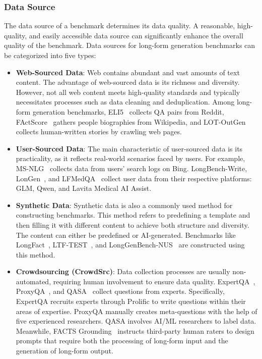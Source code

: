 \documentclass[11pt, a4paper, logo, copyright, nonumbering]{map}
\begin{document}
\subsubsection{Data Source}
\label{sec:long-form-data-source}

The data source of a benchmark determines its data quality. A reasonable, high-quality, and easily accessible data source can significantly enhance the overall quality of the benchmark. Data sources for long-form generation benchmarks can be categorized into five types:
\begin{itemize}
    \item \textbf{Web-Sourced Data}: Web contains abundant and vast amounts of text content. The advantage of web-sourced data is its richness and diversity. However, not all web content meets high-quality standards and typically necessitates processes such as data cleaning and deduplication. Among long-form generation benchmarks, ELI5~\citep{fan2019eli5} collects QA pairs from Reddit, FActScore~\citep{min2023factscore} gathers people biographies from Wikipedia, and LOT-OutGen~\citep{guan2022lot} collects human-written stories by crawling web pages.
    \item \textbf{User-Sourced Data}: The main characteristic of user-sourced data is its practicality, as it reflects real-world scenarios faced by users. For example, MS-NLG~\citep{nguyen2016ms} collects data from users' search logs on Bing. LongBench-Write\citep{bai2024longwriter}, LonGen~\citep{quan2024language}, and LFMedQA~\citep{hosseini2024benchmark} collect user data from their respective platforms: GLM, Qwen, and Lavita Medical AI Assist.
    \item \textbf{Synthetic Data}: Synthetic data is also a commonly used method for constructing benchmarks. This method refers to predefining a template and then filling it with different content to achieve both structure and diversity. The content can either be predefined or AI-generated. Benchmarks like LongFact~\citep{wei2024long}, LTF-TEST~\citep{jeung2024large}, and LongGenBench-NUS~\citep{wu2024longgenbench} are constructed using this method.
    \item \textbf{Crowdsourcing (CrowdSrc)}: Data collection processes are usually non-automated, requiring human involvement to ensure data quality. ExpertQA~\citep{malaviya2023expertqa}, ProxyQA~\citep{tan2024proxyqa}, and QASA~\citep{lee2023qasa} collect questions from experts. Specifically, ExpertQA recruits experts through Prolific to write questions within their areas of expertise. ProxyQA manually creates meta-questions with the help of five experienced researchers. QASA involves AI/ML researchers to label data. Meanwhile, FACTS Grounding~\citep{jacovi2025facts} instructs third-party human raters to design prompts that require both the processing of long-form input and the generation of long-form output.

\end{itemize}
\end{document}
